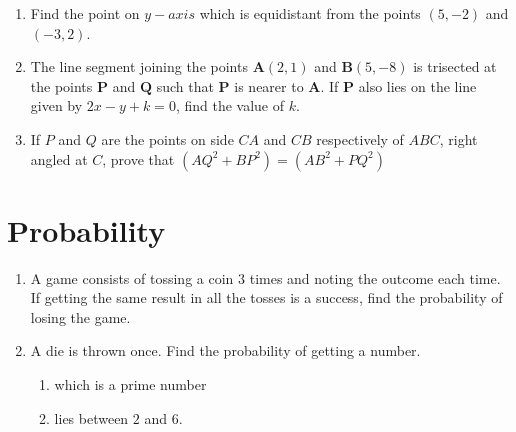 \documentclass[12pt,-letter paper]{article}
\let\vec\mathbf{}
\let\vec\mathbf{}
\let\vec\mathbf{}
\providecommand{\brak}[1]{\ensuremath{\left(#1\right)}}\graphicspath{{/storage/self/primary/Download/latexnew/fig}}
\begin{document}
\begin{enumerate}
\begin{figure}[H]
                \end{figure}
\item Find the point on $y-axis$ which is equidistant from the points $\brak{5, -2}$ and $\brak{-3, 2}$.    
\item The line segment joining the points $\vec{A}\brak{2, 1}$ and $\vec{B}\brak{5, -8}$ is trisected at the points $\vec{P}$ and $\vec{Q}$ such that $\vec{P}$ is nearer to $\vec{A}$. If $\vec{P}$ also lies on the line given by $2x-y+k=0$, find the value of $k$.
\item If $P$ and $Q$ are the points on side $CA$ and $CB$ respectively of  $ABC$, right angled at $C$, prove that $\brak{AQ^2 + BP^2} = \brak{AB^2 +PQ^2}$
\end{enumerate}


\section{Probability}
\begin{enumerate}
\item A game consists of tossing a coin $3$ times and noting the outcome each time. If getting the same result in all the tosses is a success, find the probability of losing the game.
\item A die is thrown once. Find the probability of getting a number.
\begin{enumerate}[label={\Roman*.}]
\item which is a prime number
\item lies between $2$ and $6$.
\end{enumerate}
\end{enumerate}
\end{document}
